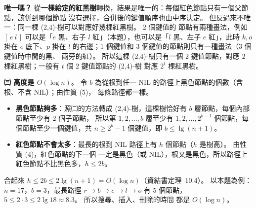 \begin{pastsoln}
\textbf{唯一嗎？} 從\textbf{一棵給定的紅黑樹}轉換，結果是唯一的：每個紅色節點只有一個父節點，該併到哪個節點
沒有選擇，合併後的鍵值順序也由中序決定。 但反過來不唯一：同一棵 (2,4)-樹可以對應好幾棵紅黑樹。 $2$ 個鍵值的
節點有兩種畫法，例如 $[\,e\;l\,]$ 可以是「$e$ 黑、右子 $l$ 紅」（本題），也可以是「$l$ 黑、左子 $e$ 紅」，此時
$k, o$ 掛在 $e$ 底下、$p$ 掛在 $l$ 的右邊；$1$ 個鍵值和 $3$ 個鍵值的節點則只有一種畫法（$3$ 個鍵值時中間的黑、
兩旁的紅）。 所以這棵 (2,4)-樹只有一個 $2$ 鍵值節點，對應 $2$ 棵紅黑樹；一般有 $t$ 個 $2$ 鍵值節點的 (2,4)-樹
對應 $2^t$ 棵紅黑樹。

\textbf{㈢ 高度是 $O(\log n)$}。 令 $b$ 為從根到任一 NIL 的路徑上黑色節點的個數（含根、不含 NIL）；由性質 (5)，
每條路徑都一樣。
\begin{itemize}
\item \textbf{黑色節點夠多}：照㈡的方法轉成 (2,4)-樹，這棵樹恰好有 $b$ 層節點，每個內部節點至少有 $2$ 個子節點，
所以第 $1, 2, \ldots, b$ 層至少有 $1, 2, \ldots, 2^{b-1}$ 個節點，每個節點至少一個鍵值，共
$n \ge 2^b - 1$ 個鍵值，即 $b \le \lg(n + 1)$。
\item \textbf{紅色節點不會太多}：最長的根到 NIL 路徑上有 $h$ 個節點（$h$ 是樹高）。 由性質 (4)，紅色節點的下一個
一定是黑色（或 NIL），根又是黑色，所以路徑上紅色節點不比黑色多，$h \le 2b$。
\end{itemize}
合起來 $h \le 2b \le 2\lg(n + 1) = O(\log n)$（資結書定理~10.4）。 以本題為例：$n = 17$，$b = 3$，最長路徑
$r \to b \to e \to l \to o$ 有 $5$ 個節點，$5 \le 2 \cdot 3 \le 2\lg 18 \approx 8.3$。 所以搜尋、插入、刪除的時間
都是 $O(\log n)$。
\end{pastsoln}
